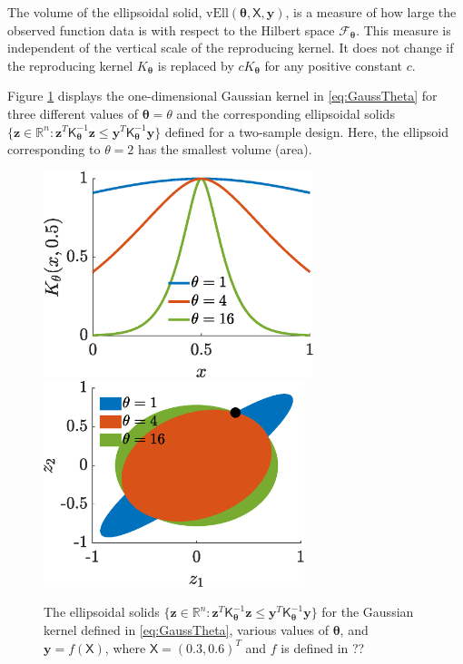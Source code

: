 \documentclass[]{mcom-l}
\theoremstyle{plain}
\theoremstyle{definition}
\newcommand{\vEll}{\text{vEll}}
\newcommand{\reals}{{\mathbb{R}}}
\newcommand{\mK}{\mathsf{K}}
\newcommand{\mX}{\mathsf{X}}
\newcommand{\by}{{\boldsymbol{y}}}
\newcommand{\bz}{{\boldsymbol{z}}}
\newcommand{\btheta}{{\boldsymbol{\theta}}}
\newcommand{\calf}{{\mathcal{F}}}
\begin{document}
The volume of the ellipsoidal solid, $\vEll(\btheta,\mX,\by)$, is a measure of how large the observed function data is with respect to the Hilbert space $\calf_{\btheta}$.  This measure is independent of the vertical scale of the reproducing kernel.  It does not change if the reproducing kernel $K_\btheta$ is replaced by $cK_{\btheta}$ for any positive constant $c$.  

Figure \ref{fig:ellipPlot} displays the one-dimensional Gaussian kernel in \eqref{eq:GaussTheta} for three different values of $\btheta = \theta$ and the corresponding  ellipsoidal solids $\{ \bz \in \reals^n : \bz^T \mK_\btheta^{-1} \bz \le \by^T \mK_\btheta^{-1} \by  \bigr \}$  defined for a two-sample design.  Here, the ellipsoid corresponding to $\theta = 2$ has the smallest volume (area).


\begin{figure}[H]
	\centering
	\includegraphics[height = 6cm]{ProgramsImages/GaussKthetaPlot.eps} \qquad
	\includegraphics[height = 6cm]{ProgramsImages/ellipsesGaussPlot.eps}
	\caption{The ellipsoidal solids $\{ \bz \in \reals^n : \bz^T \mK_\btheta^{-1} \bz \le \by^T \mK_\btheta^{-1} \by  \bigr \}$ for the Gaussian kernel defined in \eqref{eq:GaussTheta}, various values of $\btheta$, and $\by = f(\mX)$, where $\mX = (0.3, 0.6)^T$ and $f$ is defined in ?? \label{fig:ellipPlot}}
\end{figure}
\end{document}

